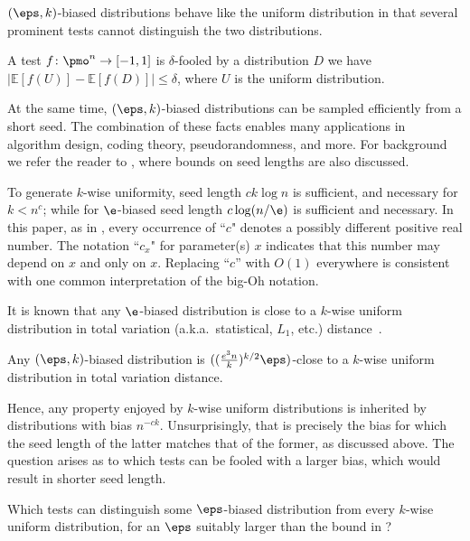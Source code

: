 $(\eps,k)$-biased distributions behave like the uniform distribution in that several prominent tests cannot distinguish the two distributions.


\begin{definition} A test $f\colon \pmo^n \to [-1,1]$ is $\delta$-fooled by a distribution $D$ we have $|\mathbb{E}[f(U)] - \mathbb{E}[f(D)]|\le \delta$, where $U$ is the uniform distribution.
\end{definition}

At the same time, $(\eps,k)$-biased distributions can be sampled efficiently from a short seed. The combination of these facts enables many applications in algorithm design, coding theory, pseudorandomness, and more. For background we refer the reader to \cite{Vadhan12,DBLP:journals/eccc/HatamiH23,moti}, where bounds on seed lengths are also discussed.

To generate $k$-wise uniformity, seed length $ck\log n$ is sufficient, and necessary for $k<n^c$; while for $\e$-biased seed length $c\log(n/\e)$ is sufficient and necessary. In this paper, as in \cite{moti}, every occurrence of ``$c$" denotes a possibly different positive real number.  The notation ``$c_x$" for parameter(s) $x$ indicates that this number may depend on $x$ and only on $x$. Replacing ``$c$'' with $O(1)$ everywhere is consistent with one common interpretation of the big-Oh notation.

It is known that any $\e$-biased distribution is close to a $k$-wise uniform distribution in  total variation (a.k.a.~statistical, $L_1$, etc.) distance~\cite{AGM03,AlonAKMRX07,OZ18}.

\begin{lemma} \label{lemma:OZ} 
  Any $(\eps,k)$-biased distribution is $((\frac{e^3n}{k})^{k/2} \eps)$-close to a $k$-wise uniform distribution in total variation distance.
\end{lemma}

Hence, any property enjoyed by $k$-wise uniform distributions is inherited by distributions with bias $n^{-ck}$.  Unsurprisingly, that is precisely the bias for which the seed length of the latter matches that of the former, as discussed above.  The question arises as to which tests can be fooled with a larger bias, which would result in shorter seed length.

\begin{question} \label{question}
Which tests can distinguish some $\eps$-biased distribution from every $k$-wise uniform distribution, for an $\eps$ suitably larger than the bound in ?
\end{question}

